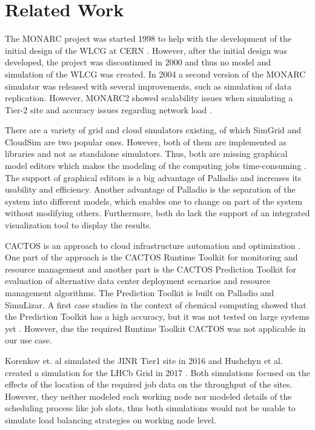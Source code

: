 \documentclass[a4paper]{jpconf}
\begin{document}
\section{Related Work}
\label{related}
The MONARC project was started 1998 to help with the development of the initial design of the WLCG at CERN \cite{monarc2000models}.
However, after the initial design was developed, the project was discontinued in 2000 and thus no model and simulation of the WLCG was created. 
In 2004 a second version of the MONARC simulator was released with several improvements, such as simulation of data replication. However, MONARC2 showed scalability issues when simulating a Tier-2 site and accuracy issues regarding network load \cite{1742-6596-331-7-072038}.

There are a variety of grid and cloud simulators existing, of which SimGrid and CloudSim are two popular ones. 
However, both of them are implemented as libraries and not as standalone simulators. Thus, both are missing graphical model editors which makes the modeling of the computing jobs time-consuming \cite{simgrid,cloudsim}. The support of graphical editors is a big advantage of Palladio and increases its usability and efficiency. Another advantage of Palladio is the separation of the system into different models, which enables one to change on part of the system without modifying others. Furthermore, both do lack the support of an integrated visualization tool to display the results.  


CACTOS is an approach to cloud infrastructure automation and optimization \cite{cactos}.
One part of the approach is the CACTOS Runtime Toolkit for monitoring and resource management and another part is the CACTOS Prediction Toolkit for evaluation of alternative data center deployment scenarios and resource management algorithms. The Prediction Toolkit is built on Palladio and SimuLizar.
A first case studies in the context of chemical computing showed that the Prediction Toolkit has a high accuracy, but it was not tested on large systems yet \cite{rapidtesting}. However, due the required Runtime Toolkit CACTOS was not applicable in our use case.

Korenkov et. al simulated the JINR Tier1 site in 2016 \cite{jinr} and Hushchyn et al. created a simulation for the LHCb Grid in 2017 \cite{lhcb}. Both simulations focused on the effects of the location of the required job data on the throughput of the sites.
However, they neither modeled each working node nor modeled details of the scheduling process like job slots, thus both simulations would not be usable to simulate load balancing strategies on working node level.
\end{document}

